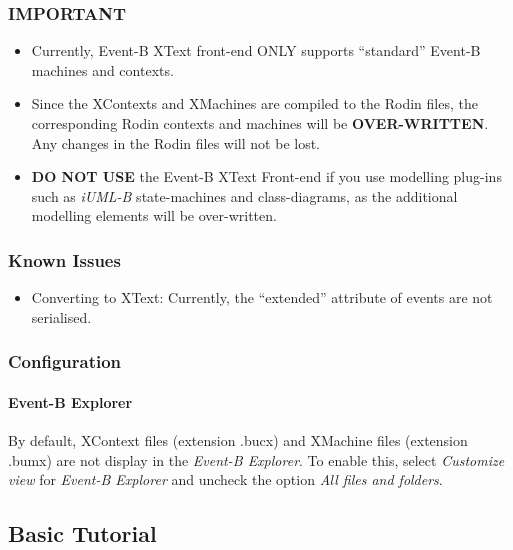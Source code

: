 \subsubsection{IMPORTANT}
\label{sec:important}

\begin{itemize}
\item Currently, Event-B XText front-end ONLY supports ``standard'' Event-B machines and contexts.

\item Since the XContexts and XMachines are compiled to the Rodin files, the corresponding Rodin contexts and machines will be \textbf{OVER-WRITTEN}. Any changes in the Rodin files will not be lost.

\item \textbf{DO NOT USE} the Event-B XText Front-end if you use modelling plug-ins such as \emph{iUML-B} state-machines and class-diagrams, as the additional modelling elements will be over-written.
\end{itemize}

\subsubsection{Known Issues}
\label{sec:known-issues}

\begin{itemize}
\item Converting to XText: Currently, the ``extended'' attribute of events are not serialised.
\end{itemize}

\subsubsection{Configuration}
\label{sec:configuration}

\paragraph{Event-B Explorer}
By default, XContext files (extension .bucx) and XMachine files (extension .bumx) are not display in the \emph{Event-B Explorer}. To enable this, select \emph{Customize view} for \emph{Event-B Explorer} and uncheck the option \emph{All files and folders}.

\subsection{Basic Tutorial}
\label{sec:basic-tutorial}

